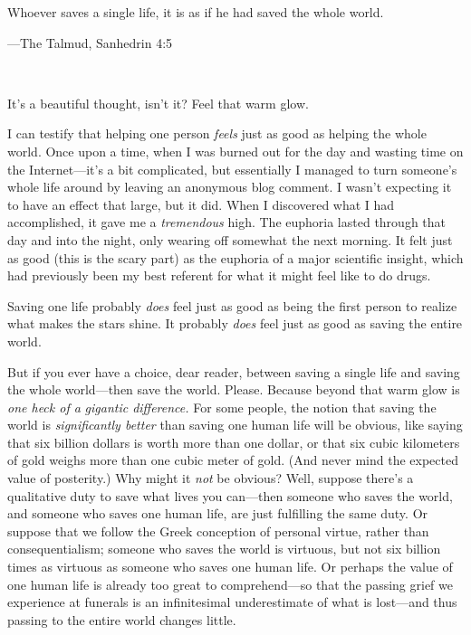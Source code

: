 {
 Whoever saves a single life, it is as if he had saved the whole
world.}

{\raggedleft
 {}---The Talmud, Sanhedrin 4:5
\par}


\bigskip

{
 ~}

{
 It's a beautiful thought, isn't
it? Feel that warm glow.}

{
 I can testify that helping one person \textit{feels} just as good
as helping the whole world. Once upon a time, when I was burned out for
the day and wasting time on the Internet---it's a bit
complicated, but essentially I managed to turn
someone's whole life around by leaving an anonymous
blog comment. I wasn't expecting it to have an effect
that large, but it did. When I discovered what I had accomplished, it
gave me a \textit{tremendous} high. The euphoria lasted through that
day and into the night, only wearing off somewhat the next morning. It
felt just as good (this is the scary part) as the euphoria of a major
scientific insight, which had previously been my best referent for what
it might feel like to do drugs.}

{
 Saving one life probably \textit{does} feel just as good as being
the first person to realize what makes the stars shine. It probably
\textit{does} feel just as good as saving the entire world.}

{
 But if you ever have a choice, dear reader, between saving a
single life and saving the whole world---then save the world. Please.
Because beyond that warm glow is \textit{one heck of a}
\textit{gigantic difference.} For some people, the notion that saving
the world is \textit{significantly better} than saving one human life
will be obvious, like saying that six billion dollars is worth more
than one dollar, or that six cubic kilometers of gold weighs more than
one cubic meter of gold. (And never mind the expected value of
posterity.) Why might it \textit{not} be obvious? Well, suppose
there's a qualitative duty to save what lives you
can---then someone who saves the world, and someone who saves one human
life, are just fulfilling the same duty. Or suppose that we follow the
Greek conception of personal virtue, rather than consequentialism;
someone who saves the world is virtuous, but not six billion times as
virtuous as someone who saves one human life. Or perhaps the value of
one human life is already too great to comprehend---so that the passing
grief we experience at funerals is an infinitesimal underestimate of
what is lost---and thus passing to the entire world changes little.}

